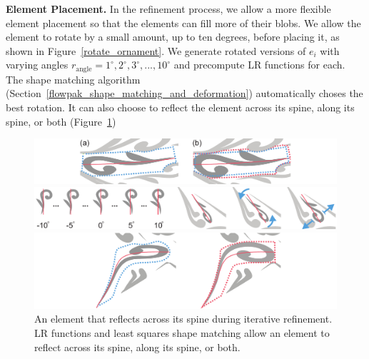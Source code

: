\textbf{Element Placement.}
In the refinement process, we allow a more flexible element placement so that
the elements can fill more of their blobs.  We allow the element
to rotate by a small amount, up to ten degrees, before placing it, as shown in
Figure~\ref{rotate_ornament}. 
We generate rotated versions of $e_{i}$ 
with varying angles $r_\mathrm{angle} = {1^{\circ}, 2^{\circ}, 3^{\circ}, ..., 10^{\circ}}$
and precompute LR functions for each. The shape matching algorithm
(Section~\ref{flowpak_shape_matching_and_deformation}) automatically choses the best rotation. It
can also choose to reflect the element across its spine, along its spine, or both (Figure~\ref{flip_shape})

\begin{figure}
\centering
\includegraphics[width=1.0\textwidth]{figures/flowpak/stretch.pdf}
\caption[Stretching an element]
{\label{stretch_ornament}
(a) An element with its sub-region blob shown in dashed blue line. Note that any blob is constrained by the neighboring elements. 
(b) The dashed red line is the grown blob, which accommodates an enlarged element.}

\bigskip
\includegraphics[width=1.0\textwidth]{figures/flowpak/rotate_ornament.pdf}
\caption[Rotating an element]
{\label{rotate_ornament}
Top row: rotated versions of the original element. 
         The best rotation angle is chosen via least squares matching.
         Bottom row: original, rotated, and enlarged versions of an element.}
\bigskip

\includegraphics[width=1.0\textwidth]{figures/flowpak/flip.pdf}
\caption[Reflecting an element]
{\label{flip_shape}
An element that reflects across its spine during iterative refinement.
LR functions and least squares shape matching allow an element to reflect
across its spine, along its spine, or both.}
\end{figure}

